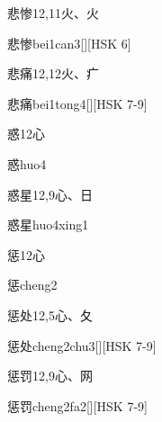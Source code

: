 \begin{Entry}{悲惨}{12,11}{⽕、⽕}
  \begin{Phonetics}{悲惨}{bei1can3}[][HSK 6]
  \end{Phonetics}
\end{Entry}

\begin{Entry}{悲痛}{12,12}{⽕、⽧}
  \begin{Phonetics}{悲痛}{bei1tong4}[][HSK 7-9]
  \end{Phonetics}
\end{Entry}

\begin{Entry}{惑}{12}{⼼}
  \begin{Phonetics}{惑}{huo4}
  \end{Phonetics}
\end{Entry}

\begin{Entry}{惑星}{12,9}{⼼、⽇}
  \begin{Phonetics}{惑星}{huo4xing1}
  \end{Phonetics}
\end{Entry}

\begin{Entry}{惩}{12}{⼼}
  \begin{Phonetics}{惩}{cheng2}
  \end{Phonetics}
\end{Entry}

\begin{Entry}{惩处}{12,5}{⼼、⼡}
  \begin{Phonetics}{惩处}{cheng2chu3}[][HSK 7-9]
  \end{Phonetics}
\end{Entry}

\begin{Entry}{惩罚}{12,9}{⼼、⽹}
  \begin{Phonetics}{惩罚}{cheng2fa2}[][HSK 7-9]
  \end{Phonetics}
\end{Entry}

